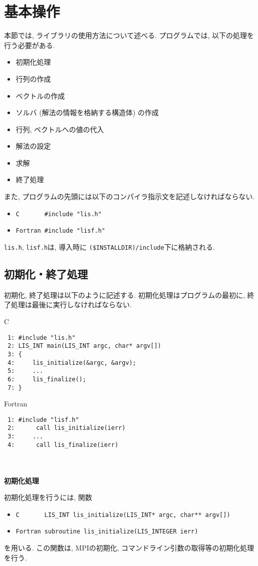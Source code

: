\documentclass[a4paper]{jarticle}
\begin{document}
{{\section{基本操作}
本節では, ライブラリの使用方法について述べる. 
プログラムでは, 以下の処理を行う必要がある. 
\begin{itemize}
\item 初期化処理
\item 行列の作成
\item ベクトルの作成
\item ソルバ (解法の情報を格納する構造体) の作成
\item 行列, ベクトルへの値の代入
\item 解法の設定
\item 求解
\item 終了処理
\end{itemize}
また, プログラムの先頭には以下のコンパイラ指示文を記述しなければならない. 
\begin{itemize}
\item \verb+C       #include "lis.h"+
\item \verb+Fortran #include "lisf.h"+
\end{itemize}
{\tt lis.h}, {\tt lisf.h}は, 導入時に
\verb|($INSTALLDIR)/include|下に格納される. 

\subsection{初期化・終了処理}
初期化, 終了処理は以下のように記述する. 初期化処理はプログラムの最初に, 
終了処理は最後に実行しなければならない. 
\begin{itembox}[l]{C}
\small
\begin{verbatim}
 1: #include "lis.h"
 2: LIS_INT main(LIS_INT argc, char* argv[])
 3: {
 4:     lis_initialize(&argc, &argv);
 5:     ...
 6:     lis_finalize();
 7: }
\end{verbatim}
\end{itembox}
\begin{itembox}[l]{Fortran}
\small
\begin{verbatim}
 1: #include "lisf.h"
 2:      call lis_initialize(ierr) 
 3:     ...
 4:      call lis_finalize(ierr)
\end{verbatim}
\end{itembox}
\\ \\
\noindent
{\bf 初期化処理}

初期化処理を行うには, 関数
\begin{itemize}
\item \verb+C       LIS_INT lis_initialize(LIS_INT* argc, char** argv[])+
\item \verb+Fortran subroutine lis_initialize(LIS_INTEGER ierr)+
\end{itemize}
を用いる. 
この関数は, MPIの初期化, コマンドライン引数の取得等の初期化処理を行う. 

}}
\end{document}

